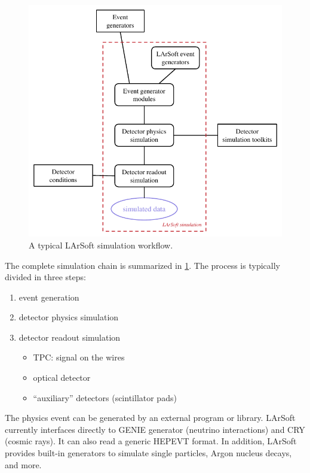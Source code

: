\begin{figure}[htbp]
  \centering
  \includegraphics{figures/LArSoftSimulationWorkflow.pdf}
  \caption{\label{fig:LArSoftSimulation}A typical LArSoft simulation workflow.}
\end{figure}
The complete simulation chain is summarized in \cref{fig:LArSoftSimulation}.
The process is typically divided in three steps:
\begin{enumerate}
   \item event generation
   \item detector physics simulation
   \item detector readout simulation
      \begin{itemize}
         \item TPC: signal on the wires
         \item optical detector
         \item ``auxiliary'' detectors (\eg scintillator pads)
      \end{itemize}
\end{enumerate}

The physics event can be generated by an external program or library.
LArSoft currently interfaces directly to GENIE generator (neutrino interactions)
and CRY (cosmic rays). It can also read a generic HEPEVT\cite{HEPEVT} format.
In addition, LArSoft provides built-in generators to simulate single particles,
Argon nucleus decays, and more.

